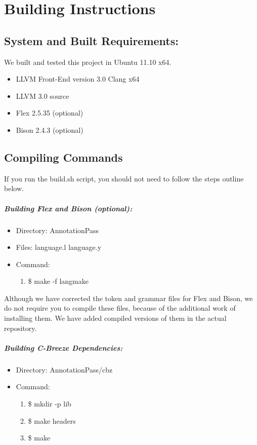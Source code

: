 \appendix
\chapter{Building Instructions}

\section{System and Built Requirements:}

We built and tested this project in Ubuntu 11.10 x64.

\begin{itemize}\itemsep.5pt
\item LLVM Front-End version 3.0 Clang x64
\item LLVM 3.0 source
\item Flex 2.5.35 (optional)
\item Bison 2.4.3 (optional)
\end{itemize}

\section{Compiling Commands}

If you run the build.sh script, you should not need to follow the steps outline below.

\paragraph{\bf  Building Flex and Bison (optional):}
\begin{itemize}\itemsep.5pt
\item Directory: AnnotationPass
\item Files: language.l language.y
\item Command: 
\begin{enumerate}\itemsep.5pt
\item \$ make -f langmake
\end{enumerate}
\end{itemize}

Although we have corrected the token and grammar files for Flex and Bison, we do not require you to compile these files, because of the additional work of installing them. We have added compiled versions of them in the actual repository.

\paragraph{\bf Building C-Breeze Dependencies:}
\begin{itemize}\itemsep.5pt
\item Directory: AnnotationPass/cbz
\item Command: 
\begin{enumerate}\itemsep.5pt
\item \$ mkdir -p lib
\item \$ make headers
\item \$ make
\end{enumerate}
\end{itemize}

